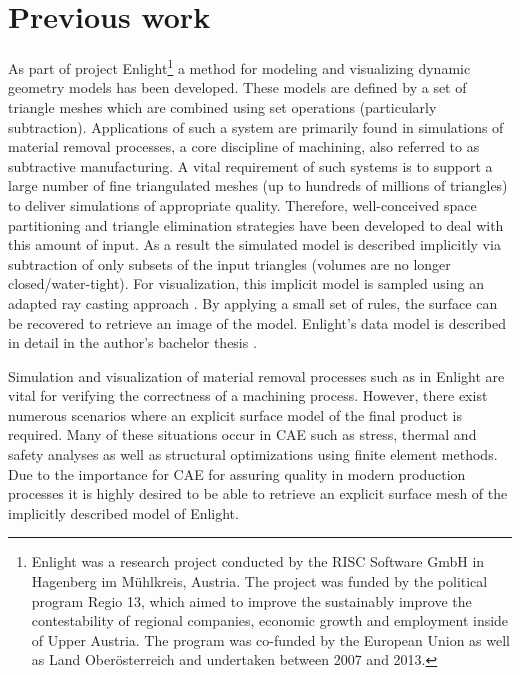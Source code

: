 
\section{Previous work}

As part of project Enlight\footnote{
	Enlight was a research project conducted by the RISC Software GmbH in Hagenberg im M\"uhlkreis, Austria. The project was funded by the political program Regio 13, which aimed to improve the sustainably improve the contestability of regional companies, economic growth and employment inside of Upper Austria. The program was co-funded by the European Union as well as Land Ober\"osterreich and undertaken between 2007 and 2013.
}
a method for modeling and visualizing dynamic geometry models has been developed. These models are defined by a set of triangle meshes which are combined using set operations (particularly subtraction). Applications of such a system are primarily found in simulations of material removal processes, a core discipline of machining, also referred to as subtractive manufacturing. A vital requirement of such systems is to support a large number of fine triangulated meshes (up to hundreds of millions of triangles) to deliver simulations of appropriate quality. Therefore, well-conceived space partitioning and triangle elimination strategies have been developed to deal with this amount of input. As a result the simulated model is described implicitly via subtraction of only subsets of the input triangles (volumes are no longer closed/water-tight). For visualization, this implicit model is sampled using an adapted ray casting approach \cite{enlight}. By applying a small set of rules, the surface can be recovered to retrieve an image of the model. Enlight's data model is described in detail in the author's bachelor thesis \cite{bachelor}.

Simulation and visualization of material removal processes such as in Enlight are vital for verifying the correctness of a machining process. However, there exist numerous scenarios where an explicit surface model of the final product is required. Many of these situations occur in CAE such as stress, thermal and safety analyses as well as structural optimizations using finite element methods.
Due to the importance for CAE for assuring quality in modern production processes it is highly desired to be able to retrieve an explicit surface mesh of the implicitly described model of Enlight.